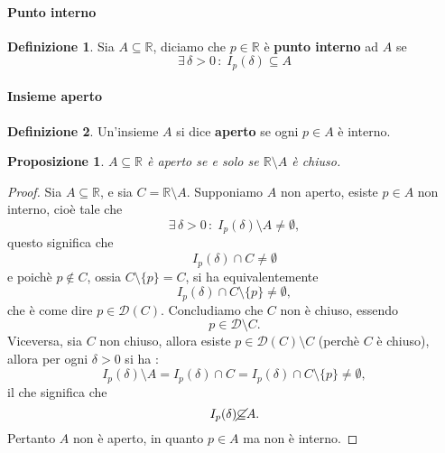 \documentclass{article}
\theoremstyle{plain}
\newtheorem{prop}[thm]{Proposizione}
\theoremstyle{definition}
\newtheorem{defn}{Definizione}[section]
\theoremstyle{remark}
\begin{document}
\paragraph{Punto interno}
\begin{bxthm}
\begin{defn}
    Sia $A\subseteq\mathbb{R}$, diciamo che $p\in\mathbb{R}$ è \textbf{punto interno} ad $A$ se 
    \[\exists\,\delta>0\,:\;I_p(\delta)\subseteq A\]
\end{defn}
\end{bxthm}

\vspace{10pt}

\paragraph{Insieme aperto}
\begin{bxthm}
\begin{defn}
    Un'insieme $A$ si dice \textbf{aperto} se ogni $p\in A$ è interno.
\end{defn}
\end{bxthm}

\vspace{10pt}

\begin{bxthm}
\begin{prop}
    $A\subseteq\mathbb{R}$ è aperto se e solo se $\mathbb{R}\setminus A$ è chiuso.
\end{prop}
\end{bxthm}
\begin{proof}
    Sia $A\subseteq\mathbb{R}$, e sia $C=\mathbb{R}\setminus A$. 
    Supponiamo $A$ non aperto, esiste $p\in A$ non interno, cioè tale che 
    \[\exists\,\delta>0\,:\;I_p(\delta)\setminus A\neq\emptyset,\]
    questo significa che \[I_p(\delta)\cap C\neq\emptyset\] e poichè $p\notin C$, 
    ossia $C\setminus\{p\}=C$, si ha equivalentemente \[I_p(\delta)\cap C\setminus\{p\}\neq\emptyset,\]
    che è come dire $p\in\mathcal{D}(C).$
    Concludiamo che $C$ non è chiuso, essendo \[p\in\mathcal{D}\setminus C.\]
    Viceversa, sia $C$ non chiuso, allora esiste $p\in \mathcal{D}(C)\setminus C$ (perchè $C$ è chiuso), allora per ogni $\delta>0$ si ha :
    \[I_p(\delta)\setminus A=I_p(\delta)\cap C=I_p(\delta)\cap C\setminus \{p\}\neq\emptyset,\] 
    il che significa che \[I_p(\delta)\cancel{\subseteq}A.\] 
    Pertanto $A$ non è aperto, in quanto $p\in A$ ma non è interno.
\end{proof}
\end{document}
